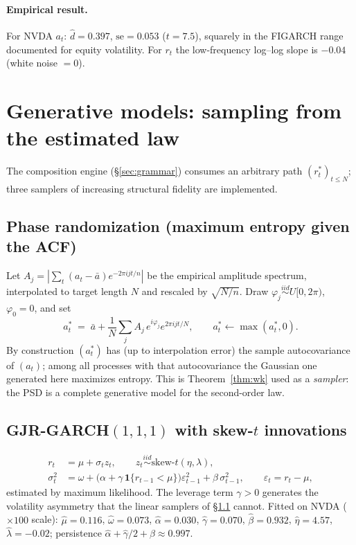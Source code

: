 \documentclass[11pt,a4paper]{article}
\newcommand{\ind}{\mathbf{1}}
\begin{document}
\paragraph{Empirical result.} For NVDA $a_t$: $\hat d = 0.397$,
$\mathrm{se}=0.053$ ($t=7.5$), squarely in the FIGARCH range documented for
equity volatility. For $r_t$ the low-frequency log--log slope is $-0.04$
(white noise $=0$).

\section{Generative models: sampling from the estimated law}

The composition engine (\S\ref{sec:grammar}) consumes an arbitrary path
$(r^\ast_t)_{t\le N}$; three samplers of increasing structural fidelity are
implemented.

\subsection{Phase randomization (maximum entropy given the ACF)}\label{sec:surrogate}

Let $A_j = |{\textstyle\sum_t} (a_t-\bar a) e^{-2\pi i jt/n}|$ be the empirical
amplitude spectrum, interpolated to target length $N$ and rescaled by
$\sqrt{N/n}$. Draw $\varphi_j \overset{iid}{\sim} U[0,2\pi)$, $\varphi_0=0$, and set
\begin{equation}
a^\ast_t \;=\; \bar a + \frac{1}{N}\sum_j A_j\, e^{i\varphi_j} e^{2\pi i jt/N},
\qquad a^\ast_t \leftarrow \max(a^\ast_t, 0).
\end{equation}
By construction $(a^\ast_t)$ has (up to interpolation error) the sample
autocovariance of $(a_t)$; among all processes with that autocovariance the
Gaussian one generated here maximizes entropy. This is
Theorem~\ref{thm:wk} used as a \emph{sampler}: the PSD is a complete generative
model for the second-order law.

\subsection{GJR-GARCH$(1,1,1)$ with skew-$t$ innovations}

\begin{align}
r_t &= \mu + \sigma_t z_t, \qquad z_t \overset{iid}{\sim}
\mathrm{skew}\text{-}t(\eta,\lambda),\\
\sigma^2_t &= \omega + \bigl(\alpha + \gamma\,\ind\{r_{t-1}<\mu\}\bigr)
\varepsilon_{t-1}^2 + \beta\,\sigma^2_{t-1},
\qquad \varepsilon_t = r_t-\mu,
\end{align}
estimated by maximum likelihood. The leverage term $\gamma>0$ generates the
volatility asymmetry that the linear samplers of \S\ref{sec:surrogate} cannot.
Fitted on NVDA ($\times 100$ scale): $\hat\mu=0.116$, $\hat\omega=0.073$,
$\hat\alpha=0.030$, $\hat\gamma=0.070$, $\hat\beta=0.932$, $\hat\eta=4.57$,
$\hat\lambda=-0.02$; persistence
$\hat\alpha+\hat\gamma/2+\hat\beta \approx 0.997$.
\end{document}
